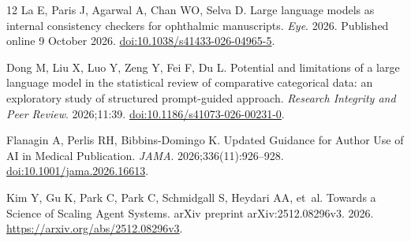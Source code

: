 \documentclass[12pt,a4paper]{article}
\begin{document}
\begin{thebibliography}{12}
La E, Paris J, Agarwal A, Chan WO, Selva D. Large language models as internal consistency checkers for ophthalmic manuscripts.
\emph{Eye}. 2026. Published online 9 October 2026.
\href{https://doi.org/10.1038/s41433-026-04965-5}{doi:10.1038/s41433-026-04965-5}.

Dong M, Liu X, Luo Y, Zeng Y, Fei F, Du L. Potential and limitations of a large language model in the statistical review of comparative categorical data: an exploratory study of structured prompt-guided approach.
\emph{Research Integrity and Peer Review}. 2026;11:39.
\href{https://doi.org/10.1186/s41073-026-00231-0}{doi:10.1186/s41073-026-00231-0}.

Flanagin A, Perlis RH, Bibbins-Domingo K. Updated Guidance for Author Use of {AI} in Medical Publication.
\emph{JAMA}. 2026;336(11):926--928.
\href{https://doi.org/10.1001/jama.2026.16613}{doi:10.1001/jama.2026.16613}.

Kim Y, Gu K, Park C, Park C, Schmidgall S, Heydari AA, et~al. Towards a Science of Scaling Agent Systems.
arXiv preprint arXiv:2512.08296v3. 2026.
\url{https://arxiv.org/abs/2512.08296v3}.

\end{thebibliography}

\end{document}
